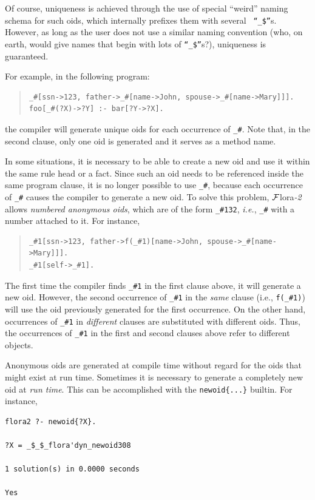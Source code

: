 \documentclass[11pt]{article}
\newcommand{\FLORA}{{\mbox{\sc ${\cal F}${lora}\rm\emph{-2}}}\xspace}
\begin{document}
Of course, uniqueness is achieved through the use of special ``weird'' naming
schema for such oids, which internally prefixes them with several {\tt
  ``\_\$''}s. However, as long as the user does not use a similar
naming convention (who, on earth, would give names that begin with lots of
{\tt ``\_\$''}s?), uniqueness is guaranteed.


For example, in the following program:
\begin{quote}
\begin{verbatim}
_#[ssn->123, father->_#[name->John, spouse->_#[name->Mary]]].
foo[_#(?X)->?Y] :- bar[?Y->?X].
\end{verbatim}
\end{quote}
the compiler will generate unique oids for each occurrence of {\tt \_\#}.
Note that, in the second clause, only one oid is generated and it serves as
a method name.

In some situations, it is necessary to be able to create a new oid and use it
within the same rule head or a fact. Since such an oid 
needs to be referenced inside the same program clause, it is no longer
possible to use \verb|_#|, because each occurrence of \verb|_#| causes the
compiler to generate a new oid. To solve this problem, \FLORA allows 
\emph{numbered anonymous oids}, which are of the form \verb|_#132|, {\it
  i.e.}, \verb|_#| with a number attached to it. For instance, 
\begin{quote}
\begin{verbatim}
_#1[ssn->123, father->f(_#1)[name->John, spouse->_#[name->Mary]]].
_#1[self->_#1].
\end{verbatim}
\end{quote}
The first time the compiler finds \verb|_#1| in the first clause above,
it will generate a new oid. However, the second occurrence of \verb|_#1|
in the \emph{same} clause (i.e., \verb|f(_#1)|)  will use the oid
previously generated for the first occurrence. On the other hand,
occurrences of \verb|_#1| in \emph{different} clauses are substituted with
different oids. Thus, the occurrences of \verb|_#1| in the first and second
clauses above refer to different objects.

Anonymous oids are generated at compile time without regard for the oids
that might exist at run time. Sometimes it is necessary to generate a
completely new oid at \emph{run time}. This can be accomplished with the
{\tt newoid\{...\}} builtin. For instance, 
\begin{verbatim}
flora2 ?- newoid{?X}.
 
?X = _$_$_flora'dyn_newoid308
 
1 solution(s) in 0.0000 seconds 
 
Yes
\end{verbatim}
\end{document}
